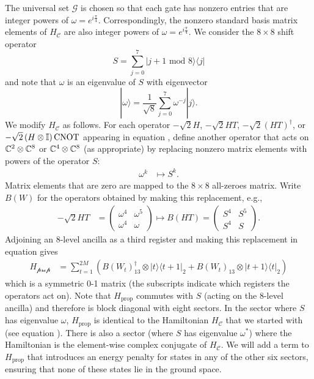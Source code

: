 \documentclass[../thesis-main/thesis-main]{subfiles}
\begin{document}
The universal set $\mathcal{G}$ is chosen so that each gate has nonzero entries that are integer powers of $\omega=e^{i\frac{\pi}{4}}$.  Correspondingly, the nonzero standard basis matrix elements of $H_{\mathcal{C}}$ are also integer powers of $\omega=e^{i\frac{\pi}{4}}$. We consider the $8\times8$ shift operator
\begin{equation}
  S=\sum_{j=0}^{7}|j+1\text{ mod 8}\rangle\langle j|
\end{equation}
and note that $\omega$ is an eigenvalue of $S$ with eigenvector
\begin{equation}
  |\omega\rangle=\frac{1}{\sqrt{8}}\sum_{j=0}^{7}\omega^{-j}|j\rangle.
\end{equation}
We modify $H_{\mathcal{C}}$ as follows. For each operator $-\sqrt{2}H$, $-\sqrt{2}HT$, $-\sqrt{2}(HT)^{\dagger}$, or $-\sqrt{2}\left(H\otimes\mathbb{I}\right)\mathrm{CNOT}$ appearing in equation , define another operator that acts on $\mathbb{C}^{2}\otimes\mathbb{C}^{8}$ or $\mathbb{C}^{4}\otimes\mathbb{C}^{8}$ (as appropriate) by replacing nonzero matrix elements with powers of the operator $S$:
\begin{align*}
  \omega^{k} &\mapsto S^{k}.
\end{align*}
Matrix elements that are zero are mapped to the $8\times8$ all-zeroes matrix. Write $B(W)$ for the operators obtained by making this replacement, e.g., 
\begin{align*}
-\sqrt{2}HT & = \begin{pmatrix}
\omega^{4} & \omega^{5}\\
\omega^{4} & \omega
\end{pmatrix} \mapsto B(HT)=\begin{pmatrix}
S^{4} & S^{5}\\
S^{4} & S
\end{pmatrix}.
\end{align*}
Adjoining an 8-level ancilla as a third register and making this replacement in equation  gives 
\begin{align}
H_{\mathcal{\text{prop}}} & =\sum_{t=1}^{2M}\left(B(W_{t})^{\dagger}_{13}\otimes|t\rangle\langle t+1|_2+B(W_{t})_{13}\otimes|t+1\rangle\langle t|_2\right)\label{eq:Hprop-1}
\end{align}
which is a symmetric $0$-1 matrix (the subscripts indicate which registers the operators act on). Note that $H_{\text{prop}}$ commutes with $S$ (acting on the $8$-level ancilla) and therefore is block diagonal with eight sectors. In the sector where $S$ has eigenvalue $\omega$, $H_{\text{prop}}$ is identical to the Hamiltonian $H_{\mathcal{C}}$ that we started with (see equation ). There is also a sector (where $S$ has eigenvalue $\omega^*$) where the Hamiltonian is the element-wise complex conjugate of $H_{\mathcal{C}}$. We will add a term to $H_{\text{prop}}$ that introduces an energy penalty for states in any of the other six sectors, ensuring that none of these states lie in the ground space.
\end{document}
